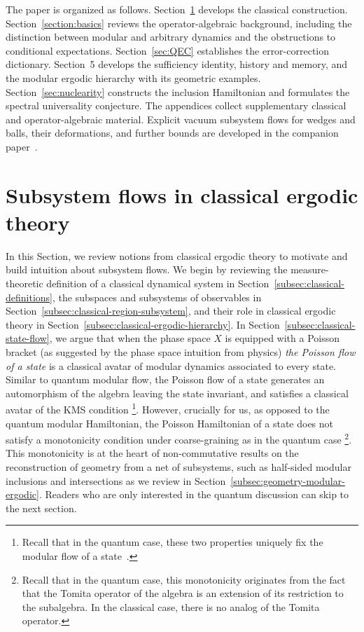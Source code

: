\documentclass[a4paper,11pt]{article}
\theoremstyle{definition}
\begin{document}
The paper is organized as follows. Section~\ref{sec:classical} develops the classical construction. Section~\ref{section:basics} reviews the operator-algebraic background, including the distinction between modular and arbitrary dynamics and the obstructions to conditional expectations. Section~\ref{sec:QEC} establishes the error-correction dictionary. Section~5 develops the sufficiency identity, history and memory, and the modular ergodic hierarchy with its geometric examples. Section~\ref{sec:nuclearity} constructs the inclusion Hamiltonian and formulates the spectral universality conjecture. The appendices collect supplementary classical and operator-algebraic material. Explicit vacuum subsystem flows for wedges and balls, their deformations, and further bounds are developed in the companion paper~\cite{companionQFT}.


\section{Subsystem flows in classical ergodic theory}\label{sec:classical}

In this Section, we review notions from classical ergodic theory to motivate and build intuition about subsystem flows.
We begin by reviewing the measure-theoretic definition of a classical dynamical system in Section~\ref{subsec:classical-definitions}, the subspaces and subsystems of observables in Section~\ref{subsec:classical-region-subsystem}, and their role in classical ergodic theory in Section~\ref{subsec:classical-ergodic-hierarchy}. In Section~\ref{subsec:classical-state-flow}, we argue that when the phase space $X$ is equipped with a Poisson bracket (as suggested by the phase space intuition from physics) {\it the Poisson flow of a state} is a classical avatar of modular dynamics associated to every state. Similar to quantum modular flow, the Poisson flow of a state generates an automorphism of the algebra leaving the state invariant, and satisfies a classical avatar of the KMS condition \footnote{Recall that in the quantum case, these two properties uniquely fix the modular flow of a state~\cite{Takesaki1970}.}. However, crucially for us, as opposed to the quantum modular Hamiltonian, the Poisson Hamiltonian of a state does not satisfy a monotonicity condition under coarse-graining as in the quantum case \footnote{Recall that in the quantum case, this monotonicity originates from the fact that the Tomita operator of the algebra is an extension of its restriction to the subalgebra. In the classical case, there is no analog of the Tomita operator.}. This monotonicity is at the heart of non-commutative results on the reconstruction of geometry from a net of subsystems, such as half-sided modular inclusions and intersections as we review in Section~\ref{subsec:geometry-modular-ergodic}. Readers who are only interested in the quantum discussion can skip to the next section.
\end{document}
